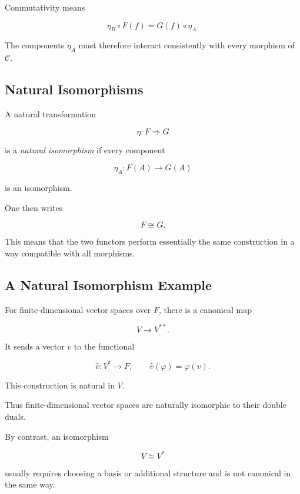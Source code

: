 Commutativity means

\[ \eta_B\circ F(f)=G(f)\circ\eta_A. \]

The components \(\eta_A\) must therefore interact consistently with every
morphism of \(\mathcal C\).

\subsection{Natural Isomorphisms}
\label{subsec:natural-isomorphisms}

A natural transformation

\[ \eta:F\Rightarrow G \]

is a \emph{natural isomorphism} if every component

\[ \eta_A:F(A)\to G(A) \]

is an isomorphism.

One then writes

\[ F\cong G. \]

This means that the two functors perform essentially the same construction
in a way compatible with all morphisms.

\subsection{A Natural Isomorphism Example}
\label{subsec:natural-isomorphism-example}

For finite-dimensional vector spaces over \(F\), there is a canonical map

\[ V\to V^{**}. \]

It sends a vector \(v\) to the functional

\[ \widehat v:V^*\to F,\qquad \widehat v(\varphi)=\varphi(v). \]

This construction is natural in \(V\).

Thus finite-dimensional vector spaces are naturally isomorphic to their
double duals.

By contrast, an isomorphism

\[ V\cong V^* \]

usually requires choosing a basis or additional structure and is not
canonical in the same way.

